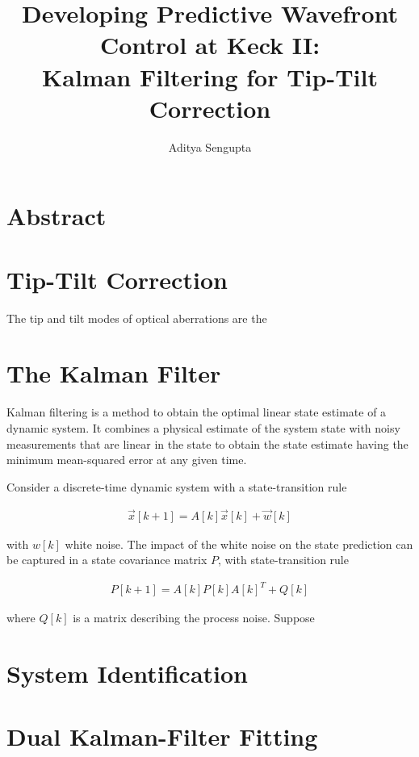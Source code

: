 \documentclass[twocolumn]{article}
\title{Developing Predictive Wavefront Control at Keck II: \\Kalman Filtering for Tip-Tilt Correction}
\author{Aditya Sengupta}
\begin{document}
	\maketitle
	\section*{Abstract}

	\section{Tip-Tilt Correction}

	The tip and tilt modes of optical aberrations are the 

	\section{The Kalman Filter}

	Kalman filtering is a method to obtain the optimal linear state estimate of a dynamic system. It combines a physical estimate of the system state with noisy measurements that are linear in the state to obtain the state estimate having the minimum mean-squared error at any given time.

	Consider a discrete-time dynamic system with a state-transition rule

	\begin{align}
		\vec{x}[k + 1] = A[k]\vec{x}[k] + \vec{w}[k]
	\end{align}

	with $w[k]$ white noise. The impact of the white noise on the state prediction can be captured in a state covariance matrix $P$, with state-transition rule

	\begin{align}
		P[k + 1] = A[k]P[k]A[k]^T + Q[k]
	\end{align}

	where $Q[k]$ is a matrix describing the process noise. Suppose 

	\section{System Identification}

	\lipsum[2]

	\section{Dual Kalman-Filter Fitting}

	\lipsum[3]
\end{document}
